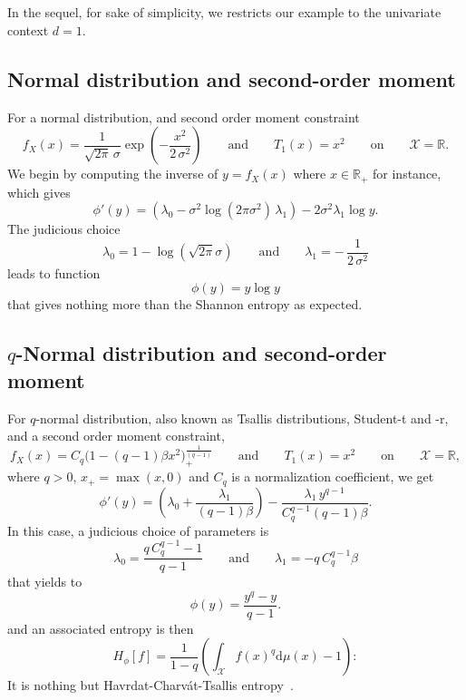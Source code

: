\documentclass[english,sort&compress]{elsarticle}
\theoremstyle{definition}
\theoremstyle{plain}
\theoremstyle{plain}
\def\dmu{\mathrm{d}\mu}
\def\Rset{\mathbb{R}}
\def\X{\mathcal{X}}
\begin{document}
\appendix

\section{}
In  the  sequel,  for sake  of  simplicity,  we  restricts  our example  to  the
univariate context $d = 1$.


\subsection{Normal distribution and second-order moment}
\label{subsec:NormalSecondOrder}

For a normal distribution, and second order moment constraint 
%
\[
f_X(x)  = \frac{1}{\sqrt{2\pi} \,\sigma}  \exp\left( -\frac{x^2}{2  \, \sigma^2}
\right)  \qquad \mbox{and}  \qquad T_1(x)  = x^2  \qquad \mbox{on}  \qquad  \X =
\Rset.
\]
%
We begin  by computing the  inverse of  $y = f_X(x)$  where $x \in  \Rset_+$ for
instance, which gives
%
\[
\phi'(y) = \left( \lambda_0 - \sigma^2 \log(2 \pi \sigma^2) \, \lambda_1 \right)
- 2 \sigma^2 \lambda_1 \log y.
\]
%
The judicious choice
%
\[
\lambda_0 = 1 - \log( \sqrt{2\pi}  \sigma ) \qquad \mbox{and} \qquad \lambda_1 =
- \, \frac{1}{2 \, \sigma^2}
\]
%
leads to function
%
\[
\phi(y) = y \log y
\]
%
that gives nothing more than the Shannon entropy as expected.



\subsection{$q$-Normal distribution and second-order moment}
\label{subsec:qNormalSecondOrder}

For $q$-normal distribution, also  known as Tsallis distributions, Student-t and
-r, and a second order moment constraint,
%
\[
f_X(x)  = C_q  \Big( 1  - (q-1)  \beta x^2  \Big)_{\!+}^{\frac{1}{(q-1)}} \qquad
\mbox{and} \qquad T_1(x) = x^2 \qquad \mbox{on} \qquad \X = \Rset,
\]
%
where $q  > 0$, $x_+ = \max(x,0)$  and $C_q$ is a  normalization coefficient, we
get
%
\[
\phi'(y)  =   \left(  \lambda_0   +  \frac{\lambda_1}{(q-1)  \beta}   \right)  -
\frac{\lambda_1 \, y^{q-1}}{C_q^{q-1} (q-1) \beta}.
\]
%
In this case, a judicious choice of parameters is
%
\[
\lambda_0 = \frac{q \, C_q^{q-1}  - 1}{q-1} \qquad \mbox{and} \qquad \lambda_1 =
-q \, C_q^{q-1} \beta
\]
%
that yields to 
%
\[
\phi(y) = \frac{y^q-y}{q-1}.
\]
%
and an associated entropy is then 
%
\[
H_\phi[f] = \frac{1}{1-q} \left( \int_\X f(x)^q \dmu(x) - 1 \right):
\]
%
It  is  nothing  but  Havrdat-Charv\'at-Tsallis  entropy~\cite{HavCha67,  Dar70,
  Tsa88, CosHer03}.
\end{document}
